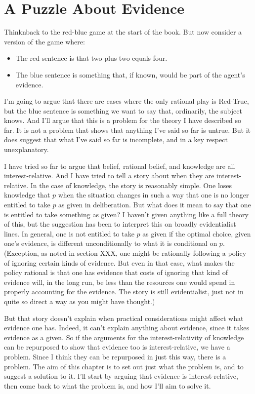 \documentclass[11pt,]{book}
\providecommand{\tightlist}{%
  \setlength{\itemsep}{0pt}\setlength{\parskip}{0pt}}
\begin{document}
\hypertarget{evpuzzle}{%
\section{A Puzzle About Evidence}\label{evpuzzle}}

Thinknback to the red-blue game at the start of the book. But now consider a version of the game where:

\begin{itemize}
\tightlist
\item
  The red sentence is that two plus two equals four.
\item
  The blue sentence is something that, if known, would be part of the
  agent's evidence.
\end{itemize}

I'm going to argue that there are cases where the only rational play is Red-True, but the blue sentence is something we want to say that, ordinarily, the subject knows. And I'll argue that this is a problem for the theory I have described so far. It is not a problem that shows that anything I've said so far is untrue. But it does suggest that what I've said so far is incomplete, and in a key respect unexplanatory.

I have tried so far to argue that belief, rational belief, and knowledge are all interest-relative. And I have tried to tell a story about when they are interest-relative. In the case of knowledge, the story is reasonably simple. One loses knowledge that \(p\) when the situation changes in such a way that one is no longer entitled to take \(p\) as given in deliberation. But what does it mean to say that one is entitled to take something as given? I haven't given anything like a full theory of this, but the suggestion has been to interpret this on broadly evidentialist lines. In general, one is not entitled to take \(p\) as given if the optimal choice, given one's evidence, is different unconditionally to what it is conditional on \(p\). (Exception, as noted in section XXX, one might be rationally following a policy of ignoring certain kinds of evidence. But even in that case, what makes the policy rational is that one has evidence that costs of ignoring that kind of evidence will, in the long run, be less than the resources one would spend in properly accounting for the evidence. The story is still evidentialist, just not in quite so direct a way as you might have thought.)

But that story doesn't explain when practical considerations might affect what evidence one has. Indeed, it can't explain anything about evidence, since it takes evidence as a given. So if the arguments for the interest-relativity of knowledge can be repurposed to show that evidence too is interest-relative, we have a problem. Since I think they can be repurposed in just this way, there is a problem. The aim of this chapter is to set out just what the problem is, and to suggest a solution to it. I'll start by arguing that evidence is interest-relative, then come back to what the problem is, and how I'll aim to solve it.
\end{document}
